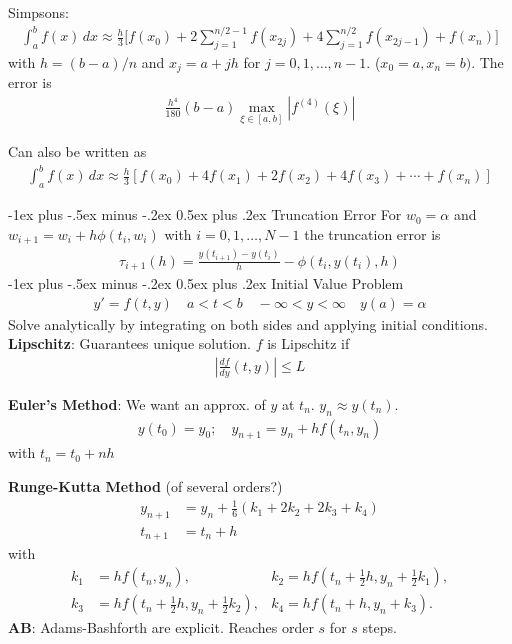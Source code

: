 \documentclass[10pt,landscape]{article}
\makeatletter
\renewcommand{\section}{\@startsection{section}{1}{0mm}%
                                {-1ex plus -.5ex minus -.2ex}%
                                {0.5ex plus .2ex}%
                                {\normalfont\large\bfseries}}
\makeatother
\begin{document}
\begin{multicols}{3}
Simpsons:
\begin{align*}
\int_a^b f(x) \, dx\approx 
\frac{h}{3}\bigg[f(x_0)+2\sum_{j=1}^{n/2-1}f(x_{2j})+
4\sum_{j=1}^{n/2}f(x_{2j-1})+f(x_n)
\bigg]
\end{align*}
with $h=(b-a)/n$ and $x_{j} = a +jh$ for $j=0,1,\ldots,
n-1$. ($x_{0}=a, x_{n}=b)$. The error is
\begin{align*}
  \frac{h^4}{180}(b-a) \max_{\xi\in[a,b]} |f^{(4)}(\xi)|
\end{align*}

Can also be written as
\begin{align*}
\int_a^b f(x) \, dx\approx
\frac{h}{3}[f(x_{0})+4f(x_1)+2f(x_2)+4f(x_3)+\cdots+f(x_n)]
\end{align*}

\section{Truncation Error}
For $w_{0} = \alpha$ and $w_{i+1} = w_{i} + h\phi(t_{i},w_{i})$ with
$i=0,1,\ldots, N-1$ the truncation error is
\begin{align*}
  \tau_{i+1}(h) = \frac{y(t_{i+1}) - y(t_{i})}{h} - \phi(t_{i},y(t_{i}),h)
\end{align*}
\section{Initial Value Problem}
\begin{align*}
  y' = f(t,y) \quad a<t<b \quad -\infty < y < \infty \quad y(a) = \alpha
\end{align*}
Solve analytically by integrating on both sides and applying initial
conditions. 
\textbf{Lipschitz}: Guarantees unique solution. 
$f$ is Lipschitz if
\begin{align*}
  \left|\frac{df}{dy}(t,y)\right| \leq L
\end{align*}

\textbf{Euler's Method}: We want an approx. of $y$ at $t_{n}$. $y_{n} \approx y(t_{n})$.
\begin{align*}
  y(t_{0}) = y_{0}; \quad
  y_{n+1} = y_{n} + h f(t_{n},y_{n})
\end{align*}
with $t_{n} = t_{0} + nh $

\textbf{Runge-Kutta Method} (of several orders?)
\begin{align*}
y_{n+1} &= y_n + \tfrac{1}{6} \left(k_1 + 2k_2 + 2k_3 + k_4 \right)\\
t_{n+1} &= t_n + h
\end{align*} with
\begin{align*}
k_1 &= hf(t_n, y_n),
&k_2 = hf(t_n + \tfrac{1}{2}h , y_n +  \tfrac{1}{2} k_1),
\\
k_3 &= hf(t_n + \tfrac{1}{2}h , y_n +   \tfrac{1}{2} k_2), 
&k_4 = hf(t_n + h , y_n + k_3).
\end{align*}
\textbf{AB}: Adams-Bashforth are explicit. Reaches order $s$ for $s$
steps. 


\end{multicols}
\end{document}
